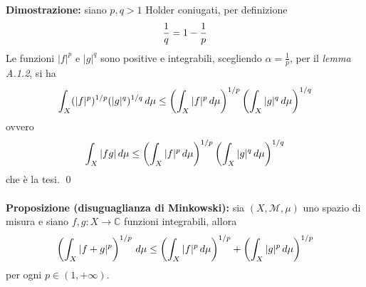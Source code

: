 \documentclass{article}
\numberwithin{equation}{subsection}
\begin{document}
\textbf{Dimostrazione:} siano $p, q > 1$ Holder coniugati, per definizione 
\begin{align*}
    \frac{1}{q} = 1 - \frac{1}{p} \notag
\end{align*}
Le funzioni $|f|^p$ e $|g|^q$ sono positive e integrabili, scegliendo $\alpha = \frac{1}{p}$, per il \textit{lemma A.1.2}, si ha 
\begin{align*}
    \int_X (|f|^p)^{1/p}(|g|^q)^{1/q} \, d\mu \leq \left(\int_X |f|^p \, d\mu\right)^{1/p}\left(\int_X |g|^q \, d\mu\right)^{1/q} \notag
\end{align*}
ovvero 
\begin{align*}
    \int_X |fg| \, d\mu \leq \left(\int_X |f|^p \, d\mu\right)^{1/p}\left(\int_X |g|^q \, d\mu\right)^{1/q} \notag
\end{align*}
che è la tesi. \qed \\ \\
\textbf{Proposizione (disuguaglianza di Minkowski):} sia $(X, \mathcal{M}, \mu)$ uno spazio di misura e siano $f, g : X \longrightarrow \mathbb{C}$ funzioni integrabili, allora 
\begin{align*}
    \left(\int_X |f + g|^p\right)^{1/p} \, d\mu \leq \left(\int_X |f|^p \, d\mu\right)^{1/p} + \left(\int_X |g|^p \, d\mu\right)^{1/p} \notag
\end{align*}
per ogni $p \in (1, +\infty)$. \\
\end{document}
